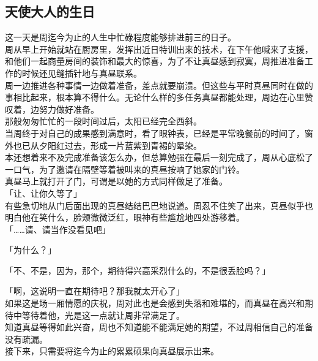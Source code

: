 \subsection{天使大人的生日}

这一天是周迄今为止的人生中忙碌程度能够排进前三的日子。\\

周从早上开始就站在厨房里，发挥出近日特训出来的技术，在下午他喊来了支援，和他们一起商量房间的装饰和最大的惊喜，为了不让真昼感到寂寞，周推进准备工作的时候还见缝插针地与真昼联系。\\

周一边推进各种事情一边做着准备，差点就要崩溃。但这些与平时真昼同时在做的事相比起来，根本算不得什么。无论什么样的多任务真昼都能处理，周边在心里赞叹着，边努力做好准备。\\

那般匆匆忙忙的一段时间过后，太阳已经完全西斜。\\

当周终于对自己的成果感到满意时，看了眼钟表，已经是平常晚餐前的时间了，窗外也已从夕阳红过去，形成一片蓝紫到青褐的晕染。\\

本还想着来不及完成准备该怎么办，但总算勉强在最后一刻完成了，周从心底松了一口气，为了邀请在隔壁等着被叫来的真昼按响了她家的门铃。\\

真昼马上就打开了门，可谓是以她的方式同样做足了准备。\\

「让、让你久等了」\\

有些急切地从门后面出现的真昼结结巴巴地说道。周忍不住笑了出来，真昼似乎也明白他在笑什么，脸颊微微泛红，眼神有些尴尬地四处游移着。\\

「……请、请当作没看见吧」

「为什么？」

「不、不是，因为，那个，期待得兴高采烈什么的，不是很丢脸吗？」

「啊，这说明一直在期待吧？那我就太开心了」\\

如果这是场一厢情愿的庆祝，周对此也是会感到失落和难堪的，而真昼在高兴和期待中等待着他，光是这一点就让周非常满足了。\\

知道真昼等得如此兴奋，周也不知道能不能满足她的期望，不过周相信自己的准备没有疏漏。\\

接下来，只需要将迄今为止的累累硕果向真昼展示出来。\\

